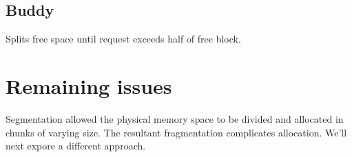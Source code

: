 \subsection{Buddy}

Splits free space until request exceeds half of free block.


\section{Remaining issues}

Segmentation allowed the physical memory space to be divided and allocated in chunks of varying size.
The resultant fragmentation complicates allocation.
We'll next expore a different approach.


